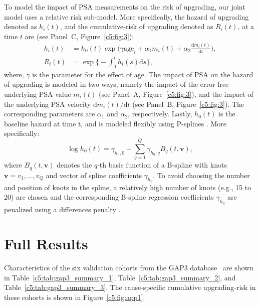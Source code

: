 \begin{subappendices}
To model the impact of PSA measurements on the risk of upgrading, our joint model uses a relative risk sub-model. More specifically, the hazard of upgrading denoted as $h_i(t)$, and the cumulative-risk of upgrading denoted as $R_i(t)$, at a time $t$ are (see Panel~C, Figure~\ref{c5:fig:3}):
\begin{equation}
\label{c5:eq:rel_risk_model}
\begin{split}
    h_i(t) &= h_0(t) \exp\Big(\gamma \mbox{age}_i +\alpha_{1} m_{i}(t) + \alpha_{2} \frac{\mathrm{d}m_{i}(t)}{\mathrm{d}{t}}\Big),\\
    R_i(t) &= \exp\Big\{-\int_0^{t} h_i(s)\mathrm{d}{s}\Big\},
    \end{split}
\end{equation}
where, $\gamma$ is the parameter for the effect of age. The impact of PSA on the hazard of upgrading is modeled in two ways, namely the impact of the error free underlying PSA value $m_{i}(t)$ (see Panel~A, Figure~\ref{c5:fig:3}), and the impact of the underlying PSA velocity $\mathrm{d}m_{i}(t)/\mathrm{d}{t}$ (see Panel~B, Figure~\ref{c5:fig:3}). The corresponding parameters are $\alpha_{1}$ and $\alpha_{2}$, respectively. Lastly, $h_0(t)$ is the baseline hazard at time t, and is modeled flexibly using P-splines \citep{eilers1996flexible}. More specifically:
\begin{equation*}
\log{h_0(t)} = \gamma_{h_0,0} + \sum_{q=1}^Q \gamma_{h_0,q} B_q(t, \boldsymbol{v}),
\end{equation*}
where $B_q(t, \boldsymbol{v})$ denotes the $q$-th basis function of a B-spline with knots $\boldsymbol{v} = v_1, \ldots, v_Q$ and vector of spline coefficients $\gamma_{h_0}$. To avoid choosing the number and position of knots in the spline, a relatively high number of knots (e.g., 15 to 20) are chosen and the corresponding B-spline regression coefficients $\gamma_{h_0}$ are penalized using a differences penalty \citep{eilers1996flexible}.

\section{Full Results}
\label{c5:appendix:full_results}
Characteristics of the six validation cohorts from the GAP3 database~\citep{gap3_2018} are shown in Table~\ref{c5:tab:gap3_summary_1}, Table~\ref{c5:tab:gap3_summary_2}, and Table~\ref{c5:tab:gap3_summary_3}. The cause-specific cumulative upgrading-risk in these cohorts is shown in Figure~\ref{c5:fig:app1}.


\end{subappendices}
